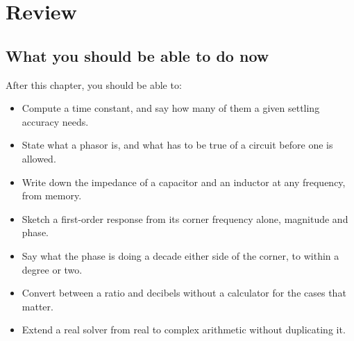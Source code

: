 

\section{Review}
\label{c2:sec:review}

\subsection*{What you should be able to do now}
After this chapter, you should be able to:
\begin{itemize}
  \item Compute a time constant, and say how many of them a given settling accuracy needs.
  \item State what a phasor is, and what has to be true of a circuit before one is allowed.
  \item Write down the impedance of a capacitor and an inductor at any frequency, from memory.
  \item Sketch a first-order response from its corner frequency alone, magnitude and phase.
  \item Say what the phase is doing a decade either side of the corner, to within a degree or two.
  \item Convert between a ratio and decibels without a calculator for the cases that matter.
  \item Extend a real solver from real to complex arithmetic without duplicating it.
\end{itemize}

